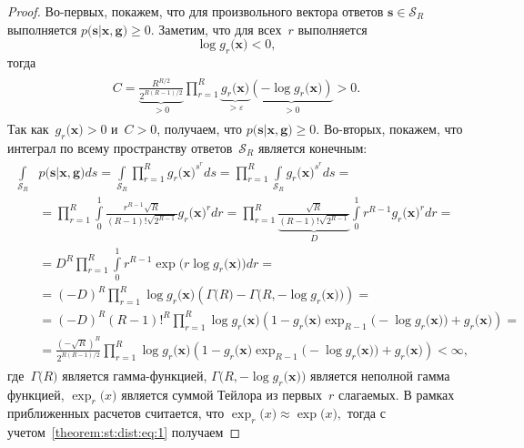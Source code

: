 \documentclass{dissert}
\begin{document}
\begin{proof}
	Во-первых, покажем, что для произвольного вектора ответов $\mathbf{s} \in \mathcal{S}_R$ выполняется $p\bigr(\mathbf{s}|\mathbf{x}, \mathbf{g}\bigr) \geq 0$. Заметим, что для всех~$r$ выполняется
	\[\log g_r\bigr(\mathbf{x}\bigr) < 0,\] тогда
\begin{gather}
\begin{aligned}
	C=\underbrace{\frac{R^{R/2}}{2^{R(R-1)/2}}}_{>0}\prod_{r=1}^{R}\underbrace{g_r\bigr(\mathbf{x}\bigr)}_{>\varepsilon}\underbrace{\left(-\log g_r\bigr(\mathbf{x}\bigr)\right)}_{>0} > 0.
\end{aligned}
\end{gather}
Так как~$g_r\bigr(\mathbf{x}\bigr) >0$ и~$C>0$, получаем, что $p\bigr(\mathbf{s}|\mathbf{x}, \mathbf{g}\bigr) \geq 0$.
	Во-вторых, покажем, что интеграл по всему пространству ответов~$\mathcal{S}_R$ является конечным:
	\begin{gather}
	\label{theorem:st:dist:eq:1}
	\begin{aligned}
		\int\limits_{\mathcal{S}_R}&p\bigr(\mathbf{s}|\mathbf{x}, \mathbf{g}\bigr)ds = \int\limits_{\mathcal{S}_R}\prod_{r=1}^{R}g_r\bigr(\mathbf{x}\bigr)^{s^r}ds = \prod_{r=1}^{R}\int\limits_{\mathcal{S}_R}g_r\bigr(\mathbf{x}\bigr)^{s^r}ds =\\ 
		& = \prod_{r=1}^{R}\int\limits_{0}^{1}\frac{r^{R-1}\sqrt{R}}{\left(R-1\right)!\sqrt{2^{R-1}}}g_r\bigr(\mathbf{x}\bigr)^{r}dr = \prod_{r=1}^{R}\underbrace{\frac{\sqrt{R}}{\left(R-1\right)!\sqrt{2^{R-1}}}}_{D}\int\limits_{0}^{1}r^{R-1}g_r\bigr(\mathbf{x}\bigr)^{r}dr =\\
		& = D^R\prod_{r=1}^{R} \int\limits_{0}^{1}r^{R-1}\exp\bigr(r\log g_r\bigr(\mathbf{x}\bigr)\bigr)dr =\\
		& = \left(-D\right)^R\prod_{r=1}^{R}\log g_r\bigr(\mathbf{x}\bigr)\left(\Gamma\bigr(R\bigr) - \Gamma\bigr(R, -\log g_r\bigr(\mathbf{x}\bigr)\bigr)\right) =\\
		& = \left(-D\right)^R\left(R-1\right)!^R\prod_{r=1}^{R}\log g_r\bigr(\mathbf{x}\bigr)\left(1 -g_r\bigr(\mathbf{x}\bigr) \exp_{R-1}\bigr(-\log g_r\bigr(\mathbf{x}\bigr)\bigr)+g_r\bigr(\mathbf{x}\bigr)\right) =\\
		& = \frac{\left(-\sqrt{R}\right)^R}{2^{R(R-1)/2}}\prod_{r=1}^{R}\log g_r\bigr(\mathbf{x}\bigr)\left(1 -g_r\bigr(\mathbf{x}\bigr) \exp_{R-1}\bigr(-\log g_r\bigr(\mathbf{x}\bigr)\bigr)+g_r\bigr(\mathbf{x}\bigr)\right) < \infty,
	\end{aligned}
	\end{gather}
где~$\Gamma\bigr(R\bigr)$ является гамма-функцией, $\Gamma\bigr(R, -\log g_r\bigr(\mathbf{x}\bigr)\bigr)$ является неполной гамма функцией, $\exp_{r}\bigr(x\bigr)$ является суммой Тейлора из первых~$r$ слагаемых. В рамках приближенных расчетов считается, что $\exp_{r}\bigr(x\bigr)\approx\exp\bigr(x\bigr),$ тогда с учетом~\eqref{theorem:st:dist:eq:1} получаем

\end{proof}
\end{document}
